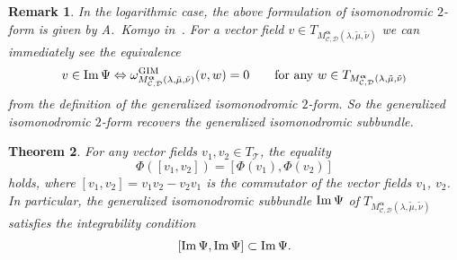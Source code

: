 \documentclass[pdftex]{sigma}
\numberwithin{equation}{section}
\newtheorem{Theorem}{Theorem}[section]
\newtheorem{Remark}[Theorem]{Remark}
\newcommand\im{\mathop{\rm Im}\nolimits}
\newcommand{\balpha}{\boldsymbol \alpha}
\begin{document}
\begin{Remark}
In the logarithmic case,
the above formulation of isomonodromic $2$-form is given by
A.~Komyo in~\cite{Komyo-1}.
For a vector field $v\in T_{M^{\balpha}_{{\mathcal C},{\mathcal D}}(\lambda,\tilde{\mu},\tilde{\nu})}$
we can immediately see the equivalence
\[
 v \in \im \Psi \Leftrightarrow
 \omega_{M^{\balpha}_{{\mathcal C},{\mathcal D}}(\lambda,\tilde{\mu},\tilde{\nu})}^{\mathrm{GIM}}
 (v,w)=0 \qquad \text{for any $w\in T_{M^{\balpha}_{{\mathcal C},{\mathcal D}}(\lambda,\tilde{\mu},\tilde{\nu})}$}
\]
from the definition of the generalized isomonodromic $2$-form.
So the generalized isomonodromic $2$-form recovers the generalized isomonodromic
subbundle.
\end{Remark}

\begin{Theorem} \label{theorem: integrability of generalized isomonodromy}
For any vector fields $v_1,v_2\in T_{\mathcal T}$,
the equality
\begin{equation*}
 \Phi([v_1,v_2])=[\Phi(v_1),\Phi(v_2)]
\end{equation*}
holds, where $[v_1,v_2]=v_1v_2-v_2v_1$ is the commutator of the vector fields $v_1$, $v_2$.
In particular,
the generalized isomonodromic subbundle $\im\Psi$ of
$T_{M^{\balpha}_{{\mathcal C},{\mathcal D}}(\lambda,\tilde{\mu},\tilde{\nu})}$
satisfies the integrability condition
\[
 [\im\Psi,\im\Psi]\subset\im\Psi.
\]
\end{Theorem}
\end{document}
